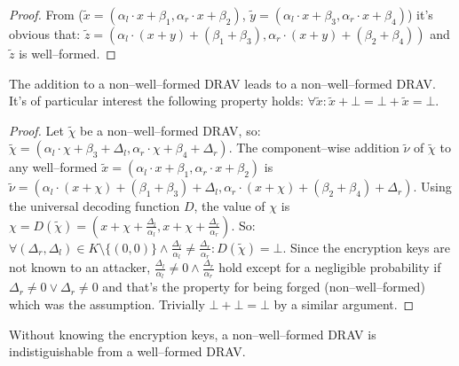 \begin{proof}

From ($\widetilde{x} = \left(\alpha_l \cdot x + \beta_1,
\alpha_r \cdot x + \beta_2\right)$, $\widetilde{y} = \left(\alpha_l \cdot x +
\beta_3, \alpha_r \cdot x + \beta_4\right)$) it's obvious that: $\widetilde{z} =
\left(\alpha_l \cdot (x+y) + (\beta_1 + \beta_3), \alpha_r \cdot (x+y) +
(\beta_2 + \beta_4)\right)$ and $\widetilde{z}$ is well--formed.

\end{proof}

\begin{lem}
  \label{lem:DRAV-add-bad}

The addition to a non--well--formed DRAV leads to a non--well--formed DRAV. It's
of particular interest the following property holds: $\forall \widetilde{x}:
\widetilde{x} + \bot = \bot + \widetilde{x} = \bot$.

\end{lem}

\begin{proof}

Let $\widetilde{\chi}$ be a
non--well--formed DRAV, so: $\widetilde{\chi} = (\alpha_l \cdot \chi + \beta_3 +
\Delta_l, \alpha_r \cdot \chi + \beta_4 + \Delta_r)$. The component--wise
addition $\widetilde{\nu}$ of $\widetilde{\chi}$ to any well--formed
$\widetilde{x} = (\alpha_l \cdot x + \beta_1, \alpha_r \cdot x + \beta_2)$ is
$\widetilde{\nu} = (\alpha_l \cdot (x+\chi) + (\beta_1+\beta_3) + \Delta_l,
\alpha_r \cdot (x+\chi) + (\beta_2+\beta_4) + \Delta_r)$. Using the universal
decoding function $D$, the value of $\chi$ is $\chi = D(\widetilde{\chi}) = (x +
\chi + \frac{\Delta_l}{\alpha_l}, x + \chi + \frac{\Delta_r}{\alpha_r})$. So:
$\forall (\Delta_r, \Delta_l) \in K \setminus \{(0, 0)\} \wedge
\frac{\Delta_l}{\alpha_l} \neq \frac{\Delta_r}{\alpha_r}: D(\widetilde{\chi}) =
\bot$. Since the encryption keys are not known to an attacker,
$\frac{\Delta_l}{\alpha_l} \neq 0 \wedge \frac{\Delta_r}{\alpha_r}$ hold except
for a negligible probability if $\Delta_r \neq 0 \vee \Delta_r \neq 0$ and
that's the property for being forged (non--well--formed) which was the
assumption. Trivially $\bot + \bot = \bot$ by a similar argument.

\end{proof}

\begin{lem}

  Without knowing the encryption keys, a non--well--formed DRAV is
  indistiguishable from a well--formed DRAV.

\end{lem}

